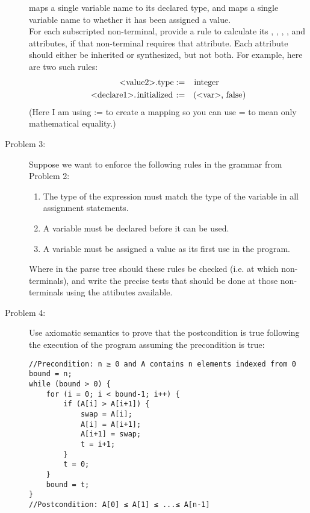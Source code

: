 \documentclass{article}
\begin{document}
\begin{description}
 maps a single variable name to its declared type, and  maps a single variable
name to whether it has been assigned a value.\\

For each subscripted non-terminal, provide a rule to calculate its  , 
                                                                    , 
                                                                    , 
                                                                    , and 
attributes, if that non-terminal requires that attribute. Each attribute should either be inherited or
synthesized, but not both. For example, here are two such rules:
\begin{align*}
\bnf{<value2>.type} :=\quad			&\bnf{integer}\\
\bnf{<declare1>.initialized} :=\quad &\bnf{(<var>, false)}
\end{align*}
(Here I am using := to create a mapping so you can use = to mean only mathematical equality.)

\item[Problem 3:] Suppose we want to enforce the following rules in the grammar from Problem 2:
\begin{enumerate}\renewcommand{\labelenumi}{(\alph{enumi}) }
\item The type of the expression must match the type of the variable in all assignment statements.
\item A variable must be declared before it can be used.
\item A variable must be assigned a value as its first use in the program.
\end{enumerate}
Where in the parse tree should these rules be checked (i.e. at which non-terminals), and write the precise
tests that should be done at those non-terminals using the attibutes available.

\item[Problem 4:] Use axiomatic semantics to prove that the postcondition is true following the execution of the
program assuming the precondition is true:
\lstset{language=C}
\begin{lstlisting}
//Precondition: n ≥ 0 and A contains n elements indexed from 0
bound = n;
while (bound > 0) {
    for (i = 0; i < bound-1; i++) {
        if (A[i] > A[i+1]) {
            swap = A[i];
            A[i] = A[i+1];
            A[i+1] = swap;
            t = i+1;
        }
        t = 0;
    }
    bound = t;
}
//Postcondition: A[0] ≤ A[1] ≤ ...≤ A[n-1]
\end{lstlisting}


\end{description}
\end{document}
